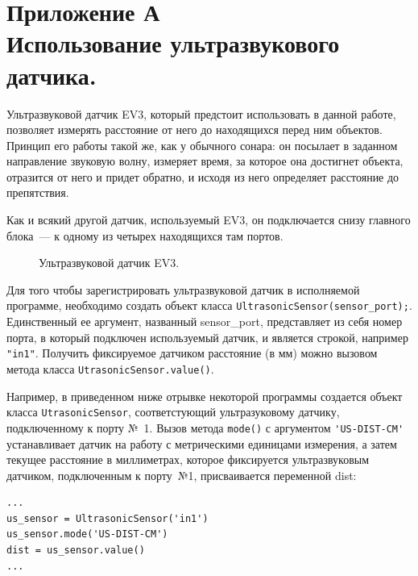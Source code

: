 \documentclass[12pt,a4paper,openany]{extarticle}
\begin{document}
\newpage
\section*{Приложение А\\
Использование ультразвукового датчика.}
Ультразвуковой датчик EV3, который предстоит использовать в данной работе, позволяет измерять расстояние от него до находящихся перед ним объектов. 
Принцип его работы такой же, как у обычного сонара: он посылает в заданном направление звуковую волну, измеряет время, за которое она достигнет объекта, отразится от него и придет обратно, и исходя из него определяет расстояние до препятствия.

Как и всякий другой датчик, используемый EV3, он подключается снизу главного блока~--- к одному из четырех находящихся там портов.

	\begin{figure}[h!]
		\caption{Ультразвуковой датчик EV3.}
		\label{ultrasonic_sensor}
	\end{figure}	
	
Для того чтобы зарегистрировать ультразвуковой датчик в исполняемой программе, необходимо создать объект класса 
\verb|UltrasonicSensor(sensor_port);|.
Единственный ее аргумент, названный sensor\_port, представляет из себя номер порта, в который подключен используемый датчик, и является строкой, например \verb|"in1"|.
Получить фиксируемое датчиком расстояние (в мм) можно вызовом метода класса \verb|UtrasonicSensor.value()|.

Например, в приведенном ниже отрывке некоторой программы создается объект класса \verb|UtrasonicSensor|, соответстующий ультразуковому датчику, подключенному к порту №~1. Вызов метода \verb|mode()| с аргументом \verb|'US-DIST-CM'| устанавливает датчик на работу с метрическими единицами измерения, а затем текущее расстояние в миллиметрах, которое фиксируется ультразвуковым датчиком, подключенным к порту~№1, присваивается переменной dist:
\begin{lstlisting}
...
us_sensor = UltrasonicSensor('in1')
us_sensor.mode('US-DIST-CM')
dist = us_sensor.value() 
...
\end{lstlisting} 
\end{document}
